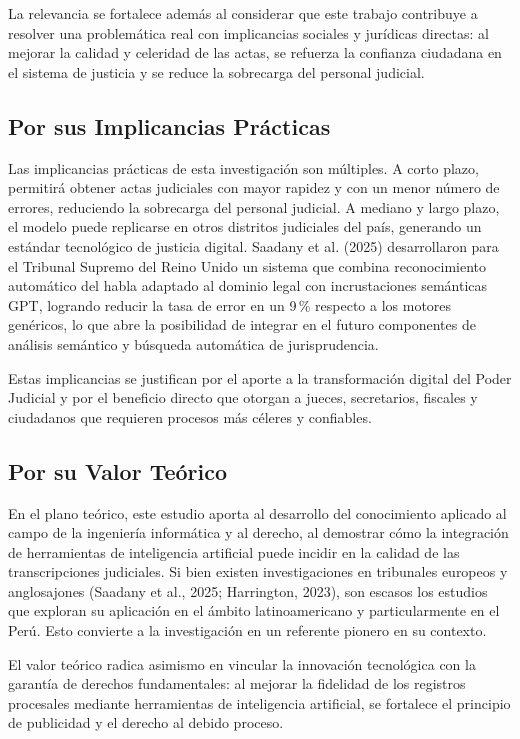 \documentclass[12pt,a4paper,oneside]{article}
\begin{document}
La relevancia se fortalece adem\'as al considerar que este trabajo contribuye a resolver una problem\'atica real con implicancias sociales y jur\'idicas directas: al mejorar la calidad y celeridad de las actas, se refuerza la confianza ciudadana en el sistema de justicia y se reduce la sobrecarga del personal judicial.

\subsection{Por sus Implicancias Pr\'acticas}

Las implicancias pr\'acticas de esta investigaci\'on son m\'ultiples. A corto plazo, permitir\'a obtener actas judiciales con mayor rapidez y con un menor n\'umero de errores, reduciendo la sobrecarga del personal judicial. A mediano y largo plazo, el modelo puede replicarse en otros distritos judiciales del pa\'is, generando un est\'andar tecnol\'ogico de justicia digital. Saadany et al. (2025) desarrollaron para el Tribunal Supremo del Reino Unido un sistema que combina reconocimiento autom\'atico del habla adaptado al dominio legal con incrustaciones sem\'anticas GPT, logrando reducir la tasa de error en un 9\,\% respecto a los motores gen\'ericos, lo que abre la posibilidad de integrar en el futuro componentes de an\'alisis sem\'antico y b\'usqueda autom\'atica de jurisprudencia.

Estas implicancias se justifican por el aporte a la transformaci\'on digital del Poder Judicial y por el beneficio directo que otorgan a jueces, secretarios, fiscales y ciudadanos que requieren procesos m\'as c\'eleres y confiables.

\subsection{Por su Valor Te\'orico}

En el plano te\'orico, este estudio aporta al desarrollo del conocimiento aplicado al campo de la ingenier\'ia inform\'atica y al derecho, al demostrar c\'omo la integraci\'on de herramientas de inteligencia artificial puede incidir en la calidad de las transcripciones judiciales. Si bien existen investigaciones en tribunales europeos y anglosajones (Saadany et al., 2025; Harrington, 2023), son escasos los estudios que exploran su aplicaci\'on en el \'ambito latinoamericano y particularmente en el Per\'u. Esto convierte a la investigaci\'on en un referente pionero en su contexto.

El valor te\'orico radica asimismo en vincular la innovaci\'on tecnol\'ogica con la garant\'ia de derechos fundamentales: al mejorar la fidelidad de los registros procesales mediante herramientas de inteligencia artificial, se fortalece el principio de publicidad y el derecho al debido proceso.
\end{document}
